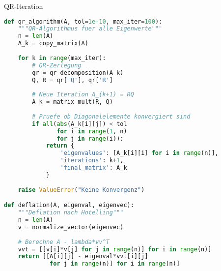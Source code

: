 \begin{examplecode}{QR-Iteration}
\begin{lstlisting}[language=Python, style=basesmol]
def qr_algorithm(A, tol=1e-10, max_iter=100):
    """QR-Algorithmus fuer alle Eigenwerte"""
    n = len(A)
    A_k = copy_matrix(A)
    
    for k in range(max_iter):
        # QR-Zerlegung
        qr = qr_decomposition(A_k)
        Q, R = qr['Q'], qr['R']
        
        # Neue Iteration A_(k+1) = RQ
        A_k = matrix_mult(R, Q)
        
        # Pruefe ob Diagonalelemente konvergiert sind
        if all(abs(A_k[i][j]) < tol 
               for i in range(1, n) 
               for j in range(i)):
            return {
                'eigenvalues': [A_k[i][i] for i in range(n)],
                'iterations': k+1,
                'final_matrix': A_k
            }
    
    raise ValueError("Keine Konvergenz")

def deflation(A, eigenval, eigenvec):
    """Deflation nach Hotelling"""
    n = len(A)
    v = normalize_vector(eigenvec)
    
    # Berechne A - lambda*vv^T
    vvt = [[v[i]*v[j] for j in range(n)] for i in range(n)]
    return [[A[i][j] - eigenval*vvt[i][j] 
             for j in range(n)] for i in range(n)]
\end{lstlisting}
\end{examplecode}

